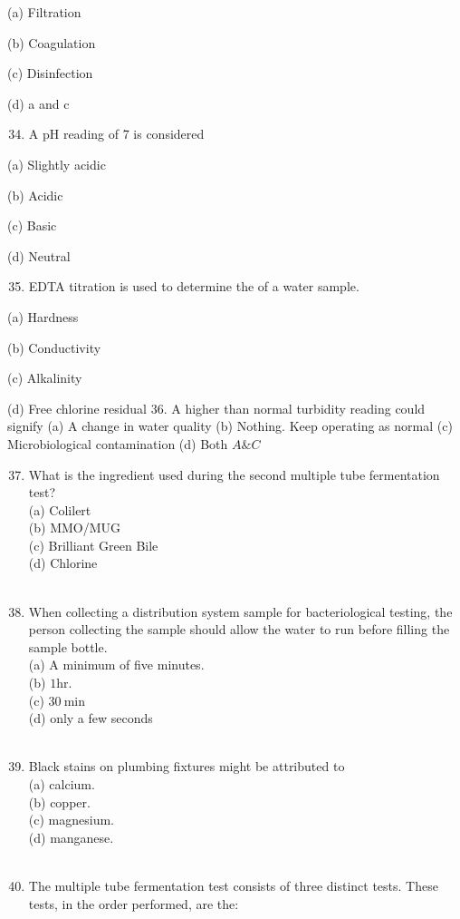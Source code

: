 \documentclass[10pt]{article}
\begin{document}
(a) Filtration

(b) Coagulation

(c) Disinfection

(d) a and c

\begin{enumerate}
  \setcounter{enumi}{33}
  \item A pH reading of 7 is considered
\end{enumerate}

(a) Slightly acidic

(b) Acidic

(c) Basic

(d) Neutral

\begin{enumerate}
  \setcounter{enumi}{34}
  \item EDTA titration is used to determine the of a water sample.
\end{enumerate}

(a) Hardness

(b) Conductivity

(c) Alkalinity

(d) Free chlorine residual 36. A higher than normal turbidity reading could signify
(a) A change in water quality
(b) Nothing. Keep operating as normal
(c) Microbiological contamination
(d) Both $A \& C$

\begin{enumerate}
  \setcounter{enumi}{36}
  \item What is the ingredient used during the second multiple tube fermentation test?\\
(a) Colilert\\
(b) MMO/MUG\\
(c) Brilliant Green Bile\\
(d) Chlorine\\
\\
  \item When collecting a distribution system sample for bacteriological testing, the person collecting the sample should allow the water to run before filling the sample bottle.\\
(a) A minimum of five minutes.\\
(b) $1 \mathrm{hr}$.\\
(c) $30 \mathrm{~min}$\\
(d) only a few seconds\\
\\
  \item Black stains on plumbing fixtures might be attributed to\\
(a) calcium.\\
(b) copper.\\
(c) magnesium.\\
(d) manganese.\\
\\
  \item The multiple tube fermentation test consists of three distinct tests. These tests, in the order performed, are the:\\


\end{enumerate}
\end{document}
